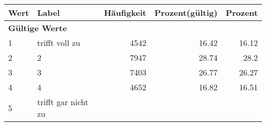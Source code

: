      \begin{longtable}{lXrrr}
     \toprule
     \textbf{Wert} & \textbf{Label} & \textbf{Häufigkeit} & \textbf{Prozent(gültig)} & \textbf{Prozent} \\
     \endhead
     \midrule
     \multicolumn{5}{l}{\textbf{Gültige Werte}}\\

     1 &
     \multicolumn{1}{X}{ trifft voll zu   } &


       \num{4542} &
       \num[round-mode=places,round-precision=2]{16.42} &
         \num[round-mode=places,round-precision=2]{16.12} \\

     2 &
     \multicolumn{1}{X}{ 2   } &


       \num{7947} &
       \num[round-mode=places,round-precision=2]{28.74} &
         \num[round-mode=places,round-precision=2]{28.2} \\

     3 &
     \multicolumn{1}{X}{ 3   } &


       \num{7403} &
       \num[round-mode=places,round-precision=2]{26.77} &
         \num[round-mode=places,round-precision=2]{26.27} \\

     4 &
     \multicolumn{1}{X}{ 4   } &


       \num{4652} &
       \num[round-mode=places,round-precision=2]{16.82} &
         \num[round-mode=places,round-precision=2]{16.51} \\

     5 &
     \multicolumn{1}{X}{ trifft gar nicht zu   } &



\end{longtable}
